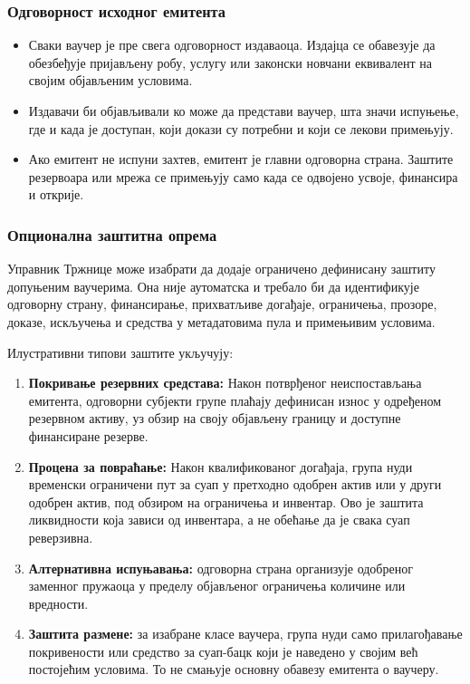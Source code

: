 \documentclass[11pt]{article}
\begin{document}
\subsubsection*{Одговорност исходног емитента}

\begin{itemize}[leftmargin=*]
\item Сваки ваучер је пре свега одговорност издаваоца. Издајца се обавезује да обезбеђује пријављену робу, услугу или законски новчани еквивалент на својим објављеним условима.
\item Издавачи би објављивали ко може да представи ваучер, шта значи испуњење, где и када је доступан, који докази су потребни и који се лекови примењују.
\item Ако емитент не испуни захтев, емитент је главни одговорна страна. Заштите резервоара или мрежа се примењују само када се одвојено усвоје, финансира и открије.
\end{itemize}
\subsubsection*{Опционална заштитна опрема}

Управник Тржнице може изабрати да додаје ограничено дефинисану заштиту допуњеним ваучерима. Она није аутоматска и требало би да идентификује одговорну страну, финансирање, прихватљиве догађаје, ограничења, прозоре, доказе, искључења и средства у метадатовима пула и примењивим условима.

Илустративни типови заштите укључују:

\begin{enumerate}[leftmargin=*]
\item \textbf{Покривање резервних средстава:} Након потврђеног неиспостављања емитента, одговорни субјекти групе плаћају дефинисан износ у одређеном резервном активу, уз обзир на своју објављену границу и доступне финансиране резерве.
\item \textbf{Процена за повраћање:} Након квалификованог догађаја, група нуди временски ограничени пут за суап у претходно одобрен актив или у други одобрен актив, под обзиром на ограничења и инвентар. Ово је заштита ликвидности која зависи од инвентара, а не обећање да је свака суап реверзивна.
\item \textbf{Алтернативна испуњавања:} одговорна страна организује одобреног заменног пружаоца у пределу објављеног ограничења количине или вредности.
\item \textbf{Заштита размене:} за изабране класе ваучера, група нуди само прилагођавање покривености или средство за суап-бацк који је наведено у својим већ постојећим условима. То не смањује основну обавезу емитента о ваучеру.
\end{enumerate}
\end{document}
